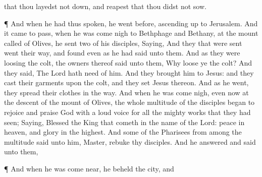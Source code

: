 {{{that
thou layedst
not
down,
and
reapest
that
thou didst
not
sow.}}
\par }{\PP {}¶
And when he
had
thus
spoken, he
went
before, ascending
up
to
Jerusalem.
And it came to
pass,
when he was come
nigh
to
Bethphage
and
Bethany,
at the
mount
called
{} of
Olives, he
sent
two of
his
disciples,
Saying,
{}
And they
that were sent
went their
way, and
found even
as he had
said unto
them.
And as
they were
loosing the
colt, the
owners
thereof
said
unto
them,
Why loose
ye the
colt?
And they
said, The
Lord
hath
need of
him.
And they
brought
him
to
Jesus:
and they
cast
their
garments
upon the
colt, and they
set
Jesus
thereon.
And as
he
went, they
spread
their
clothes
in the
way.
And when
he was come
nigh, even
now
at the
descent of the
mount of
Olives, the
whole
multitude of the
disciples
began to
rejoice and
praise
God with a
loud
voice
for
all the mighty
works
that they had
seen;
Saying,
Blessed
{} the
King
that
cometh
in the
name of the
Lord:
peace
in
heaven,
and
glory
in the
highest.
And
some of the
Pharisees
from among the
multitude
said
unto
him,
Master,
rebuke
thy
disciples.
And he
answered and
said unto
them,
{}
\par }{\PP {}¶
And
when he was come
near, he
beheld the
city, and
}
